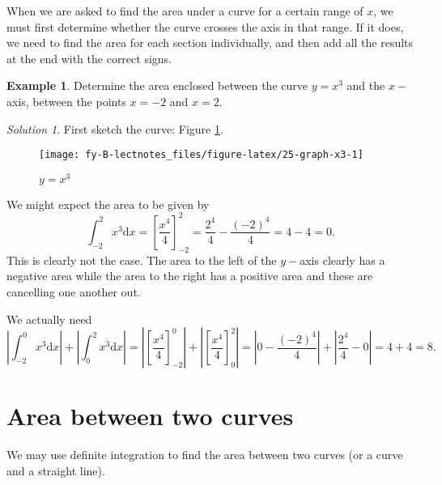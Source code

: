 \documentclass[
  english,
  11pt,
  oneside]{book}
\newcommand{\slide}{}
\theoremstyle{definition}
\theoremstyle{definition}
\newtheorem{example}{Example}[chapter]
\theoremstyle{definition}
\theoremstyle{definition}
\theoremstyle{remark}
\newtheorem*{solution}{Solution}
\begin{document}
\slide

When we are asked to find the area under a curve for a certain range of \(x\), we must first determine whether the curve crosses the axis in that range. If it does, we need to find the area for each section individually, and then add all the results at the end with the correct signs.

\slide

\begin{example}
Determine the area enclosed between the curve \(y=x^3\) and the \(x-\)axis, between the points \(x=-2\) and \(x=2\).
\end{example}

\begin{solution}
First sketch the curve: Figure \ref{fig:25-graph-x3}.

\begin{figure}

{\centering \texttt{[image: fy-B-lectnotes\_files/figure-latex/25-graph-x3-1]} 

}

\caption{$y=x^3$}\label{fig:25-graph-x3}
\end{figure}

We might expect the area to be given by
\[
\int_{-2}^2x^3\mathrm{d}x = \left[\frac{x^4}4\right]_{-2}^2 = \frac{2^4}4-\frac{(-2)^4}4 = 4-4 = 0.
\]
This is clearly not the case. The area to the left of the \(y-\)axis clearly has a negative area while the area to the right has a positive area and these are cancelling one another out.

We actually need
\[
\left|\int_{-2}^0x^3\mathrm{d}x\right|+\left|\int_0^2x^3\mathrm{d}x\right| = \left|\left[\frac{x^4}4\right]_{-2}^0\right|+\left|\left[\frac{x^4}4\right]_{0}^2\right| = \left|0-\frac{(-2)^4}4\right|+\left|\frac{2^4}4-0\right| = 4+4=8.
\]
\end{solution}

\slide

\begin{slidesonly}

\hbox{}
\slide

\end{slidesonly}

\section{Area between two curves}\label{area-between-two-curves}

We may use definite integration to find the area between two curves (or a curve and a straight line).
\end{document}
